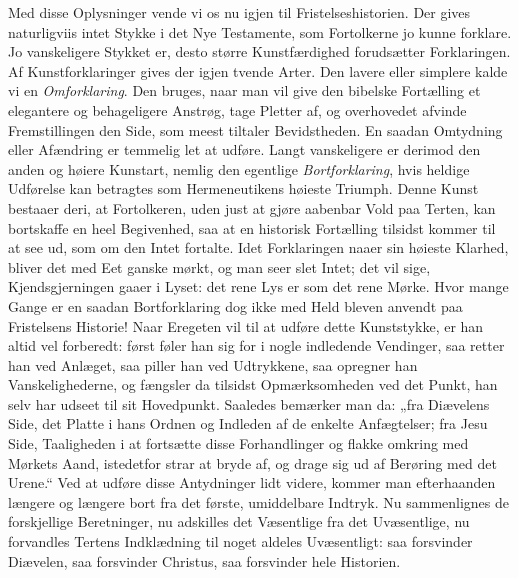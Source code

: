\documentclass[12pt,a4paper]{book}
\begin{document}
Med disse Oplysninger vende vi os nu igjen til Fristelseshistorien. Der gives
naturligviis intet Stykke i det Nye Testamente, som Fortolkerne jo kunne forklare. Jo
vanskeligere Stykket er, desto større Kunstfærdighed forudsætter Forklaringen. Af
Kunstforklaringer gives der igjen tvende Arter. Den lavere eller simplere kalde vi en
\emph{Omforklaring}. Den bruges, naar man vil give den bibelske Fortælling et elegantere
og behageligere Anstrøg, tage Pletter af, og overhovedet afvinde Fremstillingen den
Side, som meest tiltaler Bevidstheden. En saadan Omtydning eller Afændring er temmelig
let at udføre. Langt vanskeligere er derimod den anden og høiere Kunstart, nemlig den
egentlige \emph{Bortforklaring}, hvis heldige Udførelse kan betragtes som Hermeneutikens
høieste Triumph. Denne Kunst bestaaer deri, at Fortolkeren, uden just at gjøre aabenbar
Vold paa Terten, kan bortskaffe en heel Begivenhed, saa at en historisk Fortælling
tilsidst kommer til at see ud, som om den Intet fortalte. Idet Forklaringen naaer sin
høieste Klarhed, bliver det med Eet ganske mørkt, og man seer slet Intet; det vil sige,
Kjendsgjerningen gaaer i Lyset: det rene Lys er som det rene Mørke. Hvor mange Gange er
en saadan Bortforklaring dog ikke med Held bleven anvendt paa Fristelsens Historie! Naar
Eregeten vil til at udføre dette Kunststykke, er han altid vel forberedt: først føler
han sig for i nogle indledende Vendinger, saa retter han ved Anlæget, saa piller han ved
Udtrykkene, saa opregner han Vanskelighederne, og fængsler da tilsidst Opmærksomheden
ved det Punkt, han selv har udseet til sit Hovedpunkt. Saaledes bemærker man da: „fra
Diævelens Side, det Platte i hans Ordnen og Indleden
af de enkelte Anfægtelser; fra Jesu Side, Taaligheden i at fortsætte disse Forhandlinger
og flakke omkring med Mørkets Aand, istedetfor strar at bryde af, og drage sig ud af
Berøring med det Urene.“ Ved at udføre disse Antydninger lidt videre, kommer man
efterhaanden længere og længere bort fra det første, umiddelbare Indtryk. Nu
sammenlignes de forskjellige Beretninger, nu adskilles det Væsentlige fra det
Uvæsentlige, nu forvandles Tertens Indklædning til noget aldeles Uvæsentligt: saa
forsvinder Diævelen, saa forsvinder Christus, saa forsvinder hele Historien.
\end{document}
